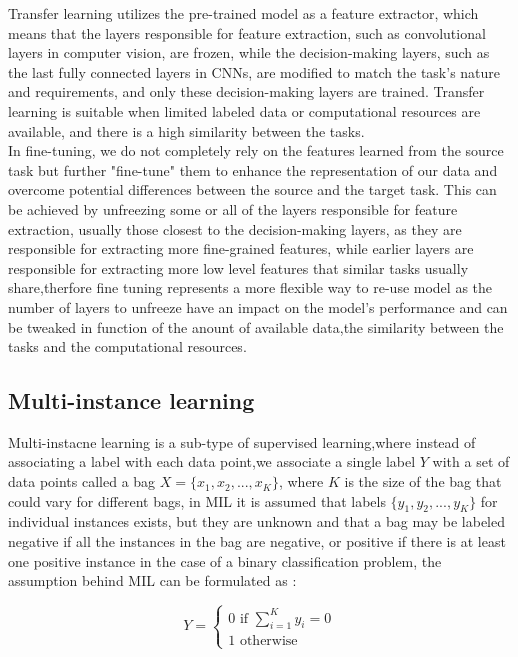 \documentclass[
11pt, %
english, %
singlespacing, %
headsepline, %
]{project_structure}
\begin{document}
\noindent Transfer learning utilizes the pre-trained model as a feature extractor, which means that the layers responsible for feature extraction, such as convolutional layers in computer vision, are frozen, while the decision-making layers, such as the last fully connected layers in \acrshort{CNN}s, are modified to match the task's nature and requirements, and only these decision-making layers are trained. Transfer learning is suitable when limited labeled data or computational resources are available, and there is a high similarity between the tasks.\\

\noindent In fine-tuning, we do not completely rely on the features learned from the source task but further "fine-tune" them to enhance the representation of our data and overcome potential differences between the source and the target task. This can be achieved by unfreezing some or all of the layers responsible for feature extraction, usually those closest to the decision-making layers, as they are responsible for extracting more fine-grained features, while earlier layers are responsible for extracting more low level features that similar tasks usually share,therfore fine tuning represents a more flexible way to re-use model as the number of layers to unfreeze have an impact on the model's performance and can be tweaked in function of the anount of available data,the similarity between the tasks and the computational resources.\\

\newpage
\subsection{Multi-instance learning}

\noindent Multi-instacne learning is a sub-type of supervised learning,where instead of associating a label with each data point,we associate a single label $Y$ with a set of data points called a bag $X = \{ x_{1},x_{2},...,x_{K} \}$, where $K$ is the size of the bag that could vary for different bags, in \acrshort{MIL} it is assumed that labels $\{y_{1},y_{2},...,y_{K}\}$ for individual instances exists, but they are unknown and that a bag may be labeled negative if all the instances in the bag are negative, or positive if there is at least one positive instance in the case of a binary classification problem, the assumption behind \acrshort{MIL} can be formulated as : 

$$
Y = \begin{cases}
    0 \text{ if } \sum\limits_{i=1}^{K} y_{i} = 0\\
    1 \text{ otherwise}
\end{cases}
$$
\end{document}
